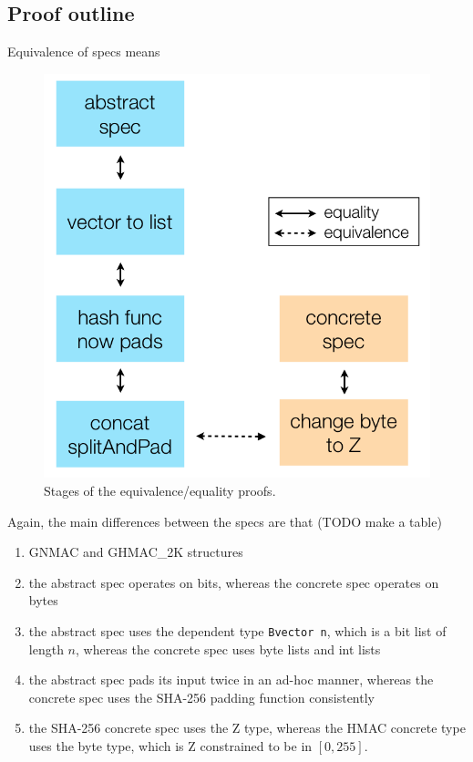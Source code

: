 \documentclass[twocolumn,showpacs,%
  nofootinbib,aps,superscriptaddress,%
  eqsecnum,prd,notitlepage,showkeys,10pt]{revtex4-1}
\begin{document}


\subsection{Proof outline}

Equivalence of specs means 

\begin{figure}[h!]
	\centering
	\includegraphics[scale=0.56]{Equivalence_proof_chain}
	\caption{Stages of the equivalence/equality proofs.}
\end{figure}

Again, the main differences between the specs are that (TODO make a table)
\begin{enumerate} 
\item GNMAC and GHMAC\_2K structures
\item the abstract spec operates on bits, whereas the concrete spec operates on bytes
\item the abstract spec uses the dependent type \verb|Bvector n|, which is a bit list of length $n$, whereas the concrete spec uses byte lists and int lists
\item the abstract spec pads its input twice in an ad-hoc manner, whereas the concrete spec uses the SHA-256 padding function consistently
\item the SHA-256 concrete spec uses the Z type, whereas the HMAC concrete type uses the byte type, which is Z constrained to be in $[0, 255]$.
\end{enumerate}
\end{document}
